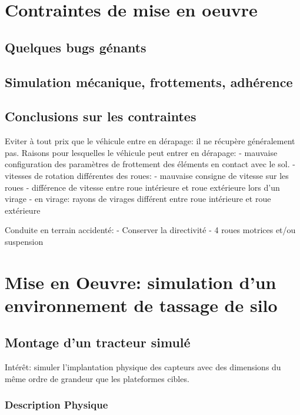 \documentclass[12pt,a4paper]{report}
\begin{document}
	\section{Contraintes de mise en oeuvre}
		\subsection{Quelques bugs génants}
		\subsection{Simulation mécanique, frottements, adhérence}
		\subsection{Conclusions sur les contraintes}
		Eviter à tout prix que le véhicule entre en dérapage: il ne récupère généralement pas.
		Raisons pour lesquelles le véhicule peut entrer en dérapage:
			- mauvaise configuration des paramètres de frottement des éléments en contact avec le sol.
			- vitesses de rotation différentes des roues: 
				- mauvaise consigne de vitesse sur les roues
				- différence de vitesse entre roue intérieure et roue extérieure lors d'un virage
			- en virage: rayons de virages différent entre roue intérieure et roue extérieure
			
		Conduite en terrain accidenté:
			- Conserver la directivité
			- 4 roues motrices et/ou suspension
			
		
	\section{Mise en Oeuvre: simulation d'un environnement de tassage de silo}
		\subsection{Montage d'un tracteur simulé}
		Intérêt: simuler l'implantation physique des capteurs avec des dimensions du même ordre de grandeur que les plateformes cibles.
		
		\subsubsection{Description Physique}
\end{document}
